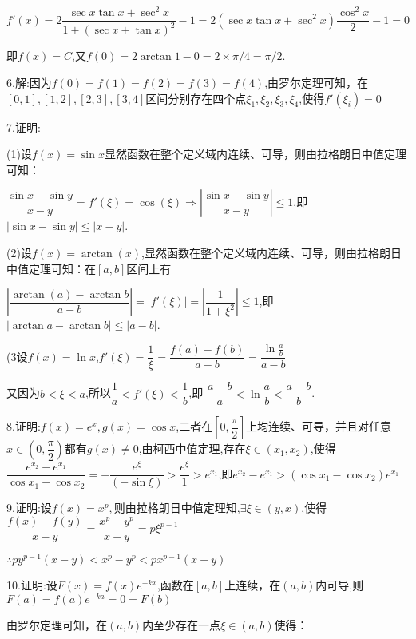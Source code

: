 $f'(x) = 2\dfrac{{\sec x\tan x + {{\sec }^2}x}}{{1 + {{(\sec x + \tan x)}^2}}} - 1 = 2(\sec x\tan x + {\sec ^2}x)\dfrac{{{{\cos }^2}x}}{2} - 1 = 0$

即$f(x) = C$,又$f(0) = 2\arctan 1 - 0 = 2 \times \pi /4 = \pi /2$.

6.解:因为$f(0) = f(1) = f(2) = f(3) = f(4)$,由罗尔定理可知，在$[0,1],[1,2],[2,3],[3,4]$区间分别存在四个点${\xi _1},{\xi _2},{\xi _3},{\xi _4}$,使得$f'({\xi _i}) = 0$

7.证明:

(1)设$f(x) = \sin x$显然函数在整个定义域内连续、可导，则由拉格朗日中值定理可知：

$\dfrac{{\sin x - \sin y}}{{x - y}} = f'(\xi ) = \cos (\xi ) \Rightarrow \left| {\dfrac{{\sin x - \sin y}}{{x - y}}} \right| \le 1$,即$\left| {\sin x - \sin y} \right| \le \left| {x - y} \right|$.

(2)设$f(x) = \arctan (x)$,显然函数在整个定义域内连续、可导，则由拉格朗日中值定理可知：在$[a,b]$区间上有

$\left| {\dfrac{{\arctan (a) - \arctan b}}{{a - b}}} \right| = \left| {f'(\xi )} \right| = \left| {\dfrac{1}{{1 + {\xi ^2}}}} \right| \le 1$,即$\left| {\arctan a - \arctan b} \right| \le \left| {a - b} \right|$.

(3设$f(x) = \ln x$,$f'(\xi ) = \dfrac{1}{\xi } = \dfrac{{f(a) - f(b)}}{{a - b}} = \dfrac{{\ln \frac{a}{b}}}{{a - b}}$

又因为$b < \xi  < a$,所以$\dfrac{1}{a} < f'(\xi ) < \dfrac{1}{b}$,即
$\dfrac{{a - b}}{a} < \ln \dfrac{a}{b} < \dfrac{{a - b}}{b}$.

8.证明:$f(x) = {e^x},g(x) = \cos x$,二者在$[0,\dfrac{\pi }{2}]$上均连续、可导，并且对任意$x \in \left( {0,\dfrac{\pi }{2}} \right)$都有$g(x) \ne 0$,由柯西中值定理,存在$\xi  \in ({x_1},{x_2})$,使得$\dfrac{{{e^{{x_2}}} - {e^{x{}_1}}}}{{\cos {x_1} - \cos {x_2}}} =  - \dfrac{{{e^\xi }}}{{( - \sin \xi )}} > \dfrac{{{e^\xi }}}{1} > {e^{{x_1}}}$,即${e^{{x_2}}} - {e^{x{}_1}} > (\cos {x_1} - \cos {x_2}){e^{{x_1}}}$

9.证明:设$f(x) = {x^p},$则由拉格朗日中值定理知,$\exists \xi  \in (y,x)$,使得$\dfrac{{f(x) - f(y)}}{{x - y}} = \dfrac{{{x^p} - {y^p}}}{{x - y}} = p{\xi ^{p - 1}}$

$\therefore p{y^{p - 1}}(x - y) < {x^p} - {y^p} < p{x^{p - 1}}(x - y)$

10.证明:设$F(x) = f(x){e^{ - kx}}$,函数在$[a,b]$上连续，在$(a,b)$内可导,则$F(a) = f(a){e^{ - ka}} = 0 = F(b)$

由罗尔定理可知，在$(a,b)$内至少存在一点$\xi  \in (a,b)$使得：

